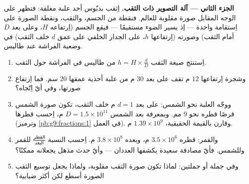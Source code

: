 \begin{problem}
\medskip
\noindent\textbf{الجزء الثاني --- آلة التصوير ذات الثقب.}
اِثقب بدبّوس أحد  علبة مغلقة: فتظهر على الوجه المقابل
صورة مقلوبة للعالم. فنقطة من الجسم، والثقب، ونقطة الصورة على
اِستقامة واحدة --- إذ يسير الضوء مستقيمًا --- فيقع الجسم
(اِرتفاعه $H$، وعلى بعد $D$ أمام الثقب) وصورته (اِرتفاعها $h$،
على الجدار الخلفي على عمق $d$ خلف الثقب) في وضعية الفراشة عند
طاليس.
\begin{enumerate}[resume]
  \item اِستنتج صيغة الثقب
        $h = H \times \frac dD$ من طاليس في الفراشة حول الثقب.
  \item وشجرة اِرتفاعها $12$ م تقف على بعد $30$ م من علبة أحذية
        عمقها $20$ سم. فما اِرتفاع صورتها، وفي أيّ اِتّجاه؟
  \item ووجّه العلبة نحو الشمس: على بعد $d = 1$ م خلف الثقب،
        تكون صورة الشمس قرصًا قطره نحو $9$ مم. وبمعرفة بعد
        الشمس $D = 1.5 \times 10^{11}$ م، اِحسب قطرها
         (وترميز \cref{pb:g9:fractions:1} في
        العمل). وقارن بالقيمة الحقيقية،
        $1.39 \times 10^9$ م.
  \item والقمر: قطره $3.5 \times 10^6$ م، وبعده
        $3.8 \times 10^8$ م. اِحسب النسبة
        $\frac{\text{القطر}}{\text{البعد}}$ للقمر وللشمس. فأيّ
        مصادفة سعيدة يكشفها العددان --- وأيّ حدث مذهل يجعلانه
        ممكنًا؟
  \item وفي جملة أو جملتين: لماذا تكون صورة الثقب مقلوبة، ولماذا
        يجعل توسيع الثقب الصورة أسطع لكن أكثر ضبابية؟
\end{enumerate}


\end{problem}
